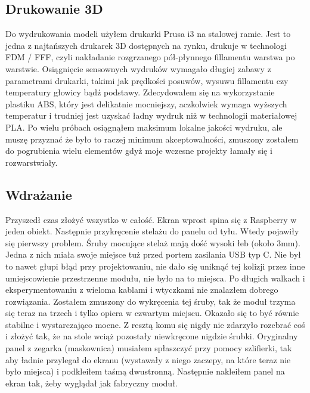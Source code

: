 \documentclass[declaration,shortabstract, inz]{iithesis}
\begin{document}
  
\subsection{Drukowanie 3D}
    Do wydrukowania modeli użyłem drukarki Prusa i3 na stalowej ramie. Jest to jedna z najtańszych drukarek 3D dostępnych na rynku, drukuje w technologi FDM / FFF, czyli nakładanie rozgrzanego pół-płynnego fillamentu warstwa po warstwie. Osiągnięcie sensownych wydruków wymagało długiej zabawy z parametrami drukarki, takimi jak prędkości posuwów, wysuwu fillamentu czy temperatury głowicy bądź podstawy. Zdecydowałem się na wykorzystanie plastiku ABS, który jest delikatnie mocniejszy, aczkolwiek wymaga wyższych temperatur i trudniej jest uzyskać ładny wydruk niż w technologii materiałowej PLA. Po wielu próbach osiągnąłem maksimum lokalne jakości wydruku, ale muszę przyznać że było to raczej minimum akceptowalności, zmuszony zostałem do pogrubienia wielu elementów gdyż moje wczesne projekty łamały się i rozwarstwiały.


\subsection{Wdrażanie}
    Przyszedł czas złożyć wszystko w całość. Ekran wprost spina się z Raspberry w jeden obiekt. Następnie przykręcenie stelażu do panelu od tyłu. Wtedy pojawiły się pierwszy problem. Śruby mocujące stelaż mają dość wysoki łeb (około 3mm). Jedna z nich miała swoje miejsce tuż przed portem zasilania USB typ C. Nie był to nawet głupi błąd przy projektowaniu, nie dało się uniknąć tej kolizji przez inne umiejscowienie przestrzenne modułu, nie było na to miejsca. Po długich walkach i eksperymentowaniu z wieloma kablami i wtyczkami nie znalazłem dobrego rozwiązania. Zostałem zmuszony do wykręcenia tej śruby, tak że moduł trzyma się teraz na trzech i tylko opiera w czwartym miejscu. Okazało się to być równie stabilne i wystarczająco mocne. Z resztą komu się nigdy nie zdarzyło rozebrać coś i złożyć tak, że na stole wciąż pozostały niewkręcone nigdzie śrubki. Oryginalny panel z zegarka (maskownica) musiałem spłaszczyć przy pomocy szlifierki, tak aby ładnie przylegał do ekranu (wystawały z niego zaczepy, na które teraz nie było miejsca) i podkleiłem taśmą dwustronną. Następnie nakleiłem panel na ekran tak, żeby wyglądał jak fabryczny moduł.
    
\end{document}
